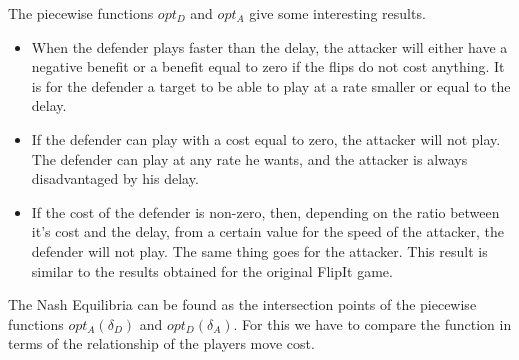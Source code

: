 The piecewise functions $opt_{D}$ and $opt_{A}$ give some interesting results. 

\begin{itemize}
\item When the defender plays faster than the delay, the attacker will either have a negative benefit or a benefit equal to zero if the flips do not cost anything. It is for the defender a target to be able to play at a rate smaller or equal to the delay.
\item If the defender can play with a cost equal to zero, the attacker will not play. The defender can play at any rate he wants, and the attacker is always disadvantaged by his delay.
\item If the cost of the defender is non-zero, then, depending on the ratio between it's cost and the delay, from a certain value for the speed of the attacker, the defender will not play. The same thing goes for the attacker. This result is similar to the results obtained for the original FlipIt game.
\end{itemize}

The Nash Equilibria can be found as the intersection points of the piecewise functions $opt_{A}(\delta_{D})$ and $opt_{D}(\delta_{A})$. For this we have to compare the function in terms of the relationship of the players move cost. %
